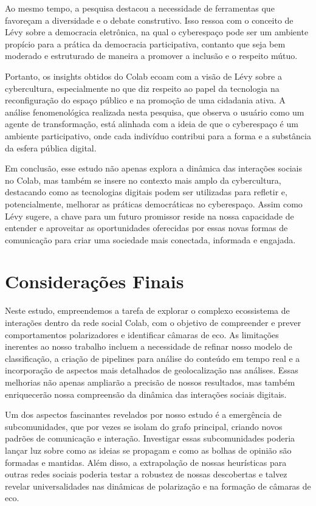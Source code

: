 Ao mesmo tempo, a pesquisa destacou a necessidade de ferramentas que favoreçam a diversidade e o debate construtivo. Isso ressoa com o conceito de Lévy sobre a democracia eletrônica, na qual o cyberespaço pode ser um ambiente propício para a prática da democracia participativa, contanto que seja bem moderado e estruturado de maneira a promover a inclusão e o respeito mútuo.

Portanto, os insights obtidos do Colab ecoam com a visão de Lévy sobre a cybercultura, especialmente no que diz respeito ao papel da tecnologia na reconfiguração do espaço público e na promoção de uma cidadania ativa. A análise fenomenológica realizada nesta pesquisa, que observa o usuário como um agente de transformação, está alinhada com a ideia de que o cyberespaço é um ambiente participativo, onde cada indivíduo contribui para a forma e a substância da esfera pública digital.

Em conclusão, esse estudo não apenas explora a dinâmica das interações sociais no Colab, mas também se insere no contexto mais amplo da cybercultura, destacando como as tecnologias digitais podem ser utilizadas para refletir e, potencialmente, melhorar as práticas democráticas no cyberespaço. Assim como Lévy sugere, a chave para um futuro promissor reside na nossa capacidade de entender e aproveitar as oportunidades oferecidas por essas novas formas de comunicação para criar uma sociedade mais conectada, informada e engajada.

\section{Considerações Finais}

Neste estudo, empreendemos a tarefa de explorar o complexo ecossistema de interações dentro da rede social Colab, com o objetivo de compreender e prever comportamentos polarizadores e identificar câmaras de eco. As limitações inerentes ao nosso trabalho incluem a necessidade de refinar nosso modelo de classificação, a criação de pipelines para análise do conteúdo em tempo real e a incorporação de aspectos mais detalhados de geolocalização nas análises. Essas melhorias não apenas ampliarão a precisão de nossos resultados, mas também enriquecerão nossa compreensão da dinâmica das interações sociais digitais.

Um dos aspectos fascinantes revelados por nosso estudo é a emergência de subcomunidades, que por vezes se isolam do grafo principal, criando novos padrões de comunicação e interação. Investigar essas subcomunidades poderia lançar luz sobre como as ideias se propagam e como as bolhas de opinião são formadas e mantidas. Além disso, a extrapolação de nossas heurísticas para outras redes sociais poderia testar a robustez de nossas descobertas e talvez revelar universalidades nas dinâmicas de polarização e na formação de câmaras de eco.

